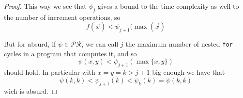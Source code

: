 \begin{theorem}
\begin{proof}
    This way we see that $\psi_j$ gives a bound to the time complexity
    as well to the number of increment operations, so
    \[f(\vec{x}) < \psi_{j+1}(\max(\vec{x})\]

    But for absurd, if $\psi \in \mathcal{PR}$, we can call $j$ the
    maximum number of nested \texttt{for} cycles in a program that
    computes it, and so \[\psi(x,y) < \psi_{j+1}(\max\{x,y\})\] should
    hold. In particular with $x=y=k>j+1$ big enough we have
    that \[\psi(k,k) < \psi_{j+1}(k) < \psi_k(k) = \psi(k,k)\] wich is
    absurd.
  \end{proof}
\end{theorem}
